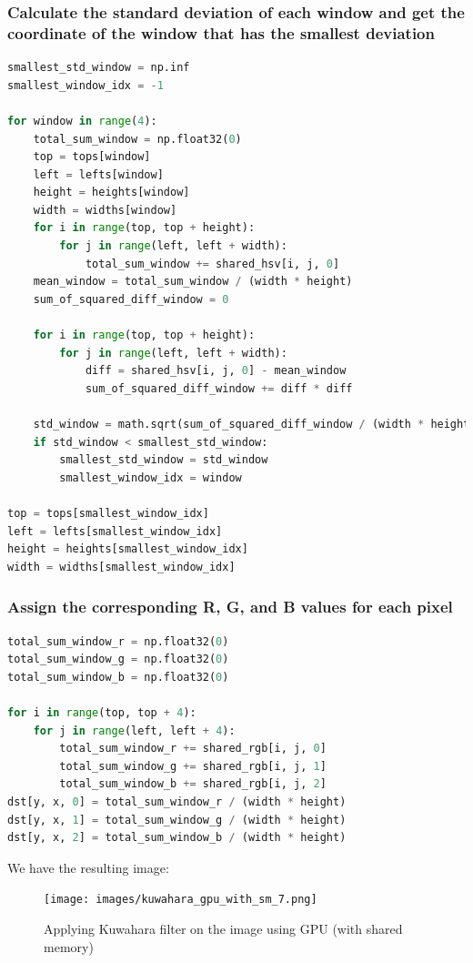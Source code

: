 \documentclass[12pt]{article}
\begin{document}
\subsubsection{Calculate the standard deviation of each window and get the coordinate of the window that has the smallest deviation}
\begin{lstlisting}[language=Python]
smallest_std_window = np.inf
smallest_window_idx = -1

for window in range(4):
    total_sum_window = np.float32(0)
    top = tops[window]
    left = lefts[window]
    height = heights[window]
    width = widths[window]
    for i in range(top, top + height):
        for j in range(left, left + width):
            total_sum_window += shared_hsv[i, j, 0]
    mean_window = total_sum_window / (width * height)
    sum_of_squared_diff_window = 0

    for i in range(top, top + height):
        for j in range(left, left + width):
            diff = shared_hsv[i, j, 0] - mean_window
            sum_of_squared_diff_window += diff * diff

    std_window = math.sqrt(sum_of_squared_diff_window / (width * height))
    if std_window < smallest_std_window:
        smallest_std_window = std_window
        smallest_window_idx = window

top = tops[smallest_window_idx]
left = lefts[smallest_window_idx]
height = heights[smallest_window_idx]
width = widths[smallest_window_idx]
\end{lstlisting}

\subsubsection{Assign the corresponding R, G, and B values for each pixel}
\begin{lstlisting}[language=Python]
total_sum_window_r = np.float32(0)
total_sum_window_g = np.float32(0)
total_sum_window_b = np.float32(0)

for i in range(top, top + 4):
    for j in range(left, left + 4):
        total_sum_window_r += shared_rgb[i, j, 0]
        total_sum_window_g += shared_rgb[i, j, 1]
        total_sum_window_b += shared_rgb[i, j, 2]
dst[y, x, 0] = total_sum_window_r / (width * height)
dst[y, x, 1] = total_sum_window_g / (width * height)
dst[y, x, 2] = total_sum_window_b / (width * height)
\end{lstlisting}

\noindent
We have the resulting image:
\begin{figure}[H]
\centering
    \texttt{[image: images/kuwahara\_gpu\_with\_sm\_7.png]}
    \caption{Applying Kuwahara filter on the image using GPU (with shared memory)}
\end{figure}
\end{document}
